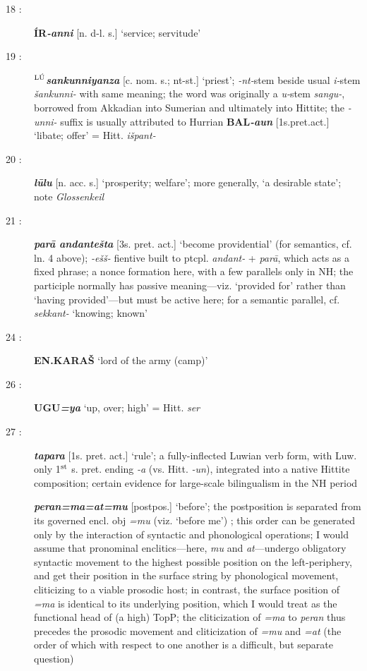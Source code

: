 \documentclass[10pt]{article}
\newcommand{\supersc}[1]{$^{\textrm{\scriptsize{#1}}}$}  	%
\newcommand{\bit}[1]{\textbf{\textit{#1}}}				%
\newcommand{\p}[1]{{\tiny[{#1}]}}					%
\newcommand{\hith}{\textsubwedge{h}}
\newcommand{\man}{\supersc{L\'U}}
\renewcommand{\.}[1]{\textsubdot{#1}}
\begin{document}
\begin{description}
\item[18 :] \textbf{\'IR}\bit{-anni} \p{n. d-l. s.} `service; servitude'

\item[19 :] \textbf{\man}\bit{sankunniyanza} \p{c. nom. s.; nt-st.} `priest'; \textit{-nt-}stem beside usual \textit{i-}stem \textit{\v{s}ankunni-} with same meaning; the word was originally a \textit{u-}stem \textit{sangu-}, borrowed from Akkadian into Sumerian and ultimately into Hittite; the \textit{-unni-} suffix is usually attributed to Hurrian  \textbf{BAL}\bit{-a{\hith\hith}un} \p{1s.pret.act.} `libate; offer' = Hitt. \textit{i\v{s}pant-}

\item[20 :] \bit{l\=ulu} \p{n. acc. s.} `prosperity; welfare'; more generally, `a desirable state'; note \textit{Glossenkeil}

\item[21 :] \bit{par\=a {\hith}andante\v{s}ta} \p{3s. pret. act.} `become providential' (for semantics, cf. ln. 4 above); \textit{-e\v{s}\v{s}-} fientive built to ptcpl. \textit{{\hith}andant-} + \textit{par\=a}, which acts as a fixed phrase; a nonce formation here, with a few parallels only in NH; the participle normally has passive meaning---viz. `provided for' rather than `having provided'---but must be active here; for a semantic parallel, cf. \textit{sekkant-} `knowing; known' 

 \item[24 :] \textbf{EN.KARA\v{S}} `lord of the army (camp)'

\item[26 :] \textbf{UGU}\bit{=ya} `up, over; high' = Hitt. \textit{ser}

\item[27 :] \bit{tapar{\hith}a} \p{1s. pret. act.} `rule'; a fully-inflected Luwian verb form, with Luw. only 1\supersc{st} s. pret. ending \textit{-{\hith}a} (vs. Hitt. \textit{-{\hith}un}), integrated into a native Hittite composition; certain evidence for large-scale bilingualism in the NH period  

\bit{peran=ma=at=mu} \p{postpos.} `before'; the postposition is separated from its governed encl. obj \textit{=mu} (viz. `before me') ; this order can be generated only by the interaction of syntactic and phonological operations; I would assume that pronominal enclitics---here, \textit{mu} and \textit{at}---undergo obligatory syntactic movement to the highest possible position on the left-periphery, and get their position in the surface string by phonological movement, cliticizing to a viable prosodic host; in contrast, the surface position of \textit{=ma} is identical to its underlying position, which I would treat as the functional head of (a high) TopP; the cliticization of \textit{=ma} to \textit{peran} thus precedes the prosodic movement and cliticization of \textit{=mu} and \textit{=at} (the order of which with respect to one another is a difficult, but separate question) 


\end{description}
\end{document}
